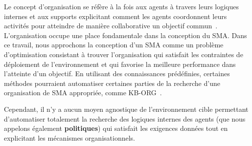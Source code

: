 \documentclass[contribution]{jfsma}
\begin{document}

Le concept d'organisation se réfère à la fois aux agents à travers leurs logiques internes et aux supports explicitant comment les agents coordonnent leurs activités pour atteindre de manière collaborative un objectif commun~\cite{Picard2009}. L'organisation occupe une place fondamentale dans la conception du SMA.
%
%
%
%
%
Dans ce travail, nous approchons la conception d'un SMA comme un problème d’optimisation consistant à trouver l’organisation qui satisfait les contraintes de déploiement de l’environnement et qui favorise la meilleure performance dans l’atteinte d’un objectif.
En utilisant des connaissances prédéfinies, certaines méthodes pourraient automatiser certaines parties de la recherche d'une organisation de SMA appropriée, comme KB-ORG~\cite{Sims2008}.

Cependant, il n'y a aucun moyen agnostique de l'environnement cible permettant d'automatiser totalement la recherche des logiques internes des agents (que nous appelons également \textbf{politiques}) qui satisfait les exigences données tout en explicitant les mécanismes organisationnels. %
\end{document}
